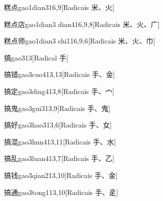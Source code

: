 \begin{entry}{糕点}{gao1dian3}{16,9}[Radicais ⽶、⽕]
\end{entry}

\begin{entry}{糕点店}{gao1dian3 dian4}{16,9,8}[Radicais ⽶、⽕、⼴]
\end{entry}

\begin{entry}{糕点师}{gao1dian3 shi1}{16,9,6}[Radicais ⽶、⽕、⼱]
\end{entry}

\begin{entry}{搞}{gao3}{13}[Radical ⼿]
\end{entry}

\begin{entry}{搞错}{gao3cuo4}{13,13}[Radicais ⼿、⾦]
\end{entry}

\begin{entry}{搞定}{gao3ding4}{13,8}[Radicais ⼿、⼧]
\end{entry}

\begin{entry}{搞鬼}{gao3gui3}{13,9}[Radicais ⼿、⿁]
\end{entry}

\begin{entry}{搞好}{gao3hao3}{13,6}[Radicais ⼿、⼥]
\end{entry}

\begin{entry}{搞混}{gao3hun4}{13,11}[Radicais ⼿、⽔]
\end{entry}

\begin{entry}{搞乱}{gao3luan4}{13,7}[Radicais ⼿、⼄]
\end{entry}

\begin{entry}{搞钱}{gao3qian2}{13,10}[Radicais ⼿、⾦]
\end{entry}

\begin{entry}{搞通}{gao3tong1}{13,10}[Radicais ⼿、⾡]
\end{entry}

